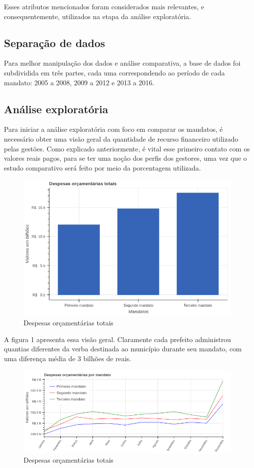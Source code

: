 \documentclass[authoryear]{elsarticle}
\begin{document}
Esses atributos mencionados foram considerados mais relevantes, e consequentemente, utilizados na etapa da análise exploratória.


\subsection{Separação de dados}
Para melhor manipulação dos dados e análise comparativa, a base de dados foi subdividida em três partes, cada uma correspondendo ao período de cada mandato: 2005 a 2008, 2009 a 2012 e 2013 a 2016.
\subsection{Análise exploratória}

Para iniciar a análise exploratória com foco em comparar os mandatos, é necessário obter uma visão geral da quantidade de recurso financeiro utilizado pelas gestões. Como explicado anteriormente, é vital esse primeiro contato com os valores reais pagos, para se ter uma noção dos perfis dos gestores, uma vez que o estudo comparativo será feito por meio da porcentagem utilizada.
\graphicspath{{figuras/}}
\begin{figure}[H]
\centering
\includegraphics[scale=0.5]{figura_1.png}
\caption{Despesas orçamentárias totais}
\label{Rotulo}
\end{figure}
A figura 1 apresenta essa visão geral. Claramente cada prefeito administrou quantias diferentes da verba destinada ao município durante seu mandato, com uma diferença média de 3 bilhões de reais.
\graphicspath{{figuras/}}
\begin{figure}[H]
\centering
\includegraphics[scale=0.5]{figura_6.png}
\caption{Despesas orçamentárias totais}
\label{Rotulo}
\end{figure}
\end{document}
